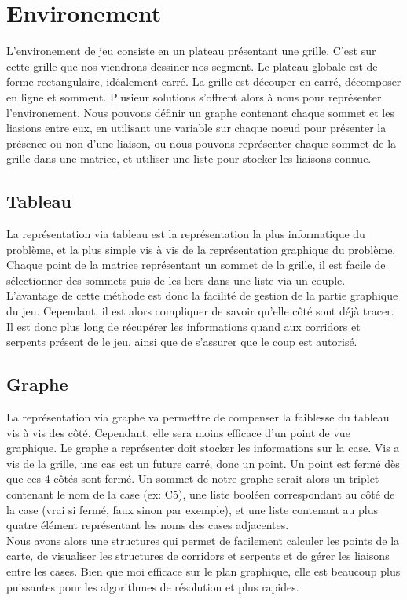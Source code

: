 \documentclass[a4paper,12pt]{report}
\begin{document}
\chapter{Environement}

L'environement de jeu consiste en un plateau pr\'esentant une grille. C'est sur cette grille que nos viendrons dessiner nos segment. Le plateau globale est de forme rectangulaire, id\'ealement carr\'e. La grille est d\'ecouper en carr\'e, d\'ecomposer en ligne et somment. Plusieur solutions s'offrent alors \`a nous pour repr\'esenter l'environement. Nous pouvons d\'efinir un graphe contenant chaque sommet et les liasions entre eux, en utilisant une variable sur chaque noeud pour pr\'esenter la pr\'esence ou non d'une liaison, ou nous pouvons repr\'esenter chaque sommet de la grille dans une matrice, et utiliser une liste pour stocker les liaisons connue. \\

\section{Tableau}

La repr\'esentation via tableau est la repr\'esentation la plus informatique du probl\`eme, et la plus simple vis \`a vis de la repr\'esentation graphique du probl\`eme. Chaque point de la matrice repr\'esentant un sommet de la grille, il est facile de s\'electionner des sommets puis de les liers dans une liste via un couple.\\
L'avantage de cette m\'ethode est donc la facilit\'e de gestion de la partie graphique du jeu. Cependant, il est alors compliquer de savoir qu'elle c\^ot\'e sont d\'ej\`a tracer. Il est donc plus long de r\'ecup\'erer les informations quand aux corridors et serpents pr\'esent de le jeu, ainsi que de s'assurer que le coup est autoris\'e.

\section{Graphe}

La repr\'esentation via graphe va permettre de compenser la faiblesse du tableau vis \`a vis des c\^ot\'e. Cependant, elle sera moins efficace d'un point de vue graphique. Le graphe a repr\'esenter doit stocker les informations sur la case. Vis a vis de la grille, une cas est un future carr\'e, donc un point. Un point est ferm\'e d\`es que ces 4 c\^ot\'es sont ferm\'e. Un sommet de notre graphe serait alors un triplet contenant le nom de la case (ex: C5), une liste bool\'een correspondant au c\^ot\'e de la case (vrai si ferm\'e, faux sinon par exemple), et une liste contenant au plus quatre \'el\'ement repr\'esentant les noms des cases adjacentes. \\
Nous avons alors une structures qui permet de facilement calculer les points de la carte, de visualiser les structures de corridors et serpents et de g\'erer les liaisons entre les cases. Bien que moi efficace sur le plan graphique, elle est beaucoup plus puissantes pour les algorithmes de r\'esolution et plus rapides. 
\end{document}
